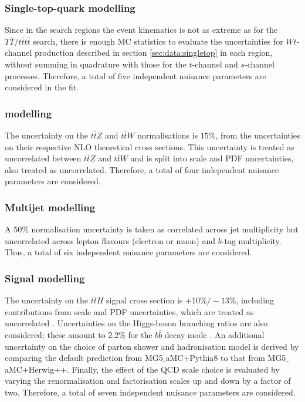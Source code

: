 \subsubsection{Single-top-quark modelling}
Since in the search regions the event kinematics  is not as extreme as for the $T\bar{T}/t\bar{t}t\bar{t}$ search, there is enough MC statistics to evaluate the uncertainties for $Wt$-channel production described in section \ref{sec:data:singletop} in each region, without summing in quadrature with those for the $t$-channel and $s$-channel processes. Therefore, a total of five independent nuisance parameters are considered in the fit.

\subsubsection[$t\bar{t}+V$ modelling uncertainties]{ modelling}

The uncertainty on the $t\bar{t}Z$ and $t\bar{t}W$ normalisations is $15\%$, from the uncertainties on their respective NLO theoretical cross sections. This uncertainty is treated as uncorrelated between $t\bar{t}Z$ and $t\bar{t}W$ and is split into scale and PDF uncertainties, also treated as uncorrelated. Therefore, a total of four independent nuisance parameters are considered.

\subsubsection{Multijet modelling}

A $50\%$ normalisation uncertainty is taken as correlated across jet multiplicity but uncorrelated across lepton flavours (electron or muon) and $b$-tag multiplicity. Thus, a total of six independent nuisance parameters are considered.

\subsubsection{Signal modelling}
The uncertainty on the $t\bar{t}H$ signal cross section is $+10\%/-13\%$, including contributions from scale and PDF uncertainties, which are treated as uncorrelated \cite{ttH1,ttH4,Yu:2014cka}. Uncertainties on the Higgs-boson branching ratios are also considered; these amount to $2.2\%$ for the $b\bar{b}$ decay mode \cite{hdecay}. An additional uncertainty on the choice of parton shower and hadronisation model is derived by comparing the default prediction from {\sc MG5$\_$aMC+Pythia8} to that from {\sc MG5$\_$aMC}+{\sc Herwig++}. Finally, the effect of the QCD scale choice is evaluated by varying the renormalisation and factorisation scales up and down by a factor of two. Therefore, a total of seven independent nuisance parameters are considered.


